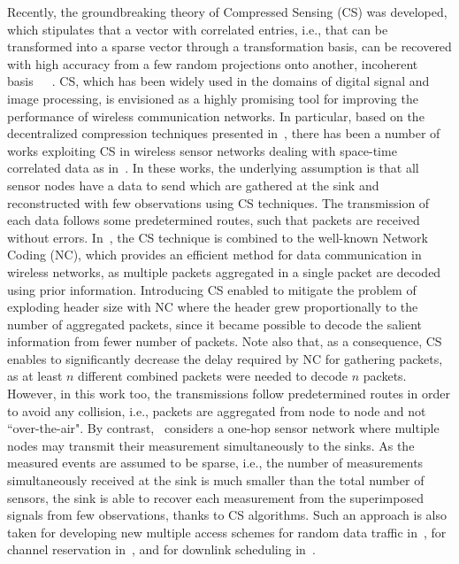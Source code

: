 \documentclass[letterpaper,conference]{IEEEtran}
\begin{document}
Recently, the groundbreaking theory of Compressed Sensing (CS) was developed, which stipulates that a vector with correlated entries, i.e., that can be transformed into a sparse vector through a transformation basis, can be recovered with high accuracy from a few random projections onto another, incoherent basis~\cite{Can06feb}~\cite{Don06apr}~\cite{Can06dec}. CS, which has been widely used in the domains of digital signal and image processing, is envisioned as a highly promising tool for improving the performance of wireless communication networks.
In particular, based on the decentralized compression techniques presented in~\cite{Hau08mar}, there has been a number of works exploiting CS in wireless sensor networks dealing with space-time correlated data as in~\cite{Que09feb}\cite{Wan10oct}. In these works, the underlying assumption is that all sensor nodes have a data to send which are gathered at the sink and reconstructed with few observations using CS techniques. The transmission of each data follows some predetermined routes, such that packets are received without errors. In~\cite{Ngu10oct}, the CS technique is combined to the well-known Network Coding (NC), which provides an efficient method for data communication in wireless networks, as multiple packets aggregated in a single packet are decoded using prior information. Introducing CS enabled to mitigate the problem of exploding header size with NC where the header grew proportionally to the number of aggregated packets, since it became possible to decode the salient information from fewer number of packets. Note also that, as a consequence, CS enables to significantly decrease the delay required by NC for gathering packets, as at least $n$ different combined packets were needed to decode $n$ packets. However, in this work too, the transmissions follow predetermined routes in order to avoid any collision, i.e., packets are aggregated from node to node and not
``over-the-air".
By contrast,~\cite{Men09mar} considers a one-hop sensor network where multiple nodes may transmit their measurement simultaneously to the sinks. As the measured events are assumed to be sparse, i.e., the number of measurements simultaneously received at the sink is much smaller than the total number of sensors, the sink is able to recover each measurement from the superimposed signals from few observations, thanks to CS algorithms.
Such an approach is also taken for developing new multiple access schemes for random data traffic in~\cite{Mao10apr}, for channel reservation in~\cite{Qas09sep}, and for downlink scheduling in~\cite{Bha09jun}.
\end{document}
